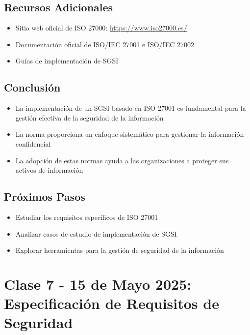 \documentclass[12pt,a4paper]{article}
\begin{document}
\subsection{Recursos Adicionales}
\begin{itemize}
    \item Sitio web oficial de ISO 27000: \url{https://www.iso27000.es/}
    \item Documentación oficial de ISO/IEC 27001 e ISO/IEC 27002
    \item Guías de implementación de SGSI
\end{itemize}

\subsection{Conclusión}
\begin{itemize}
    \item La implementación de un SGSI basado en ISO 27001 es fundamental para la gestión efectiva de la seguridad de la información
    \item La norma proporciona un enfoque sistemático para gestionar la información confidencial
    \item La adopción de estas normas ayuda a las organizaciones a proteger sus activos de información
\end{itemize}

\subsection{Próximos Pasos}
\begin{itemize}
    \item Estudiar los requisitos específicos de ISO 27001
    \item Analizar casos de estudio de implementación de SGSI
    \item Explorar herramientas para la gestión de seguridad de la información
\end{itemize}


\section{Clase 7 - 15 de Mayo 2025: Especificación de Requisitos de Seguridad}
\end{document}
